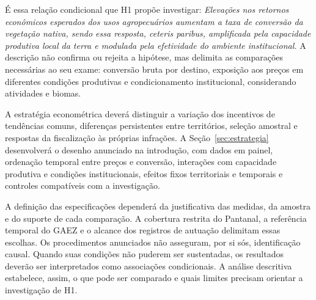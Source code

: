 É essa relação condicional que H1 propõe investigar: \emph{Elevações nos retornos econômicos esperados dos usos agropecuários aumentam a taxa de conversão da vegetação nativa, sendo essa resposta, \textit{ceteris paribus}, amplificada pela capacidade produtiva local da terra e modulada pela efetividade do ambiente institucional.} A descrição não confirma ou rejeita a hipótese, mas delimita as comparações necessárias ao seu exame: conversão bruta por destino, exposição aos preços em diferentes condições produtivas e condicionamento institucional, considerando atividades e biomas.

A estratégia econométrica deverá distinguir a variação dos incentivos de tendências comuns, diferenças persistentes entre territórios, seleção amostral e respostas da fiscalização às próprias infrações. A Seção~\ref{sec:estrategia} desenvolverá o desenho anunciado na introdução, com dados em painel, ordenação temporal entre preços e conversão, interações com capacidade produtiva e condições institucionais, efeitos fixos territoriais e temporais e controles compatíveis com a investigação.

A definição das especificações dependerá da justificativa das medidas, da amostra e do suporte de cada comparação. A cobertura restrita do Pantanal, a referência temporal do GAEZ e o alcance dos registros de autuação delimitam essas escolhas. Os procedimentos anunciados não asseguram, por si sós, identificação causal. Quando suas condições não puderem ser sustentadas, os resultados deverão ser interpretados como associações condicionais. A análise descritiva estabelece, assim, o que pode ser comparado e quais limites precisam orientar a investigação de H1.

\endgroup
